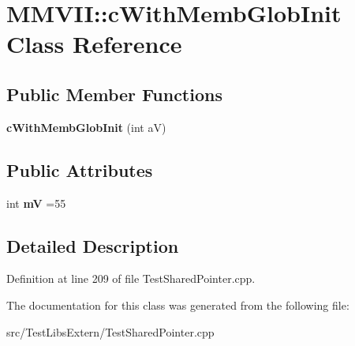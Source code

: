 \hypertarget{classMMVII_1_1cWithMembGlobInit}{}\section{M\+M\+V\+II\+:\+:c\+With\+Memb\+Glob\+Init Class Reference}
\label{classMMVII_1_1cWithMembGlobInit}
\subsection*{Public Member Functions}
\begin{DoxyCompactItemize}
\item 
{\bfseries c\+With\+Memb\+Glob\+Init} (int aV)\hypertarget{classMMVII_1_1cWithMembGlobInit_a79efa7afacafb8f55c06275c93701c36}{}\label{classMMVII_1_1cWithMembGlobInit_a79efa7afacafb8f55c06275c93701c36}

\end{DoxyCompactItemize}
\subsection*{Public Attributes}
\begin{DoxyCompactItemize}
\item 
int {\bfseries mV} =55\hypertarget{classMMVII_1_1cWithMembGlobInit_a31261ea2cffe1d62a2980705e7ba328a}{}\label{classMMVII_1_1cWithMembGlobInit_a31261ea2cffe1d62a2980705e7ba328a}

\end{DoxyCompactItemize}


\subsection{Detailed Description}


Definition at line 209 of file Test\+Shared\+Pointer.\+cpp.



The documentation for this class was generated from the following file\+:\begin{DoxyCompactItemize}
\item 
src/\+Test\+Libs\+Extern/Test\+Shared\+Pointer.\+cpp\end{DoxyCompactItemize}
